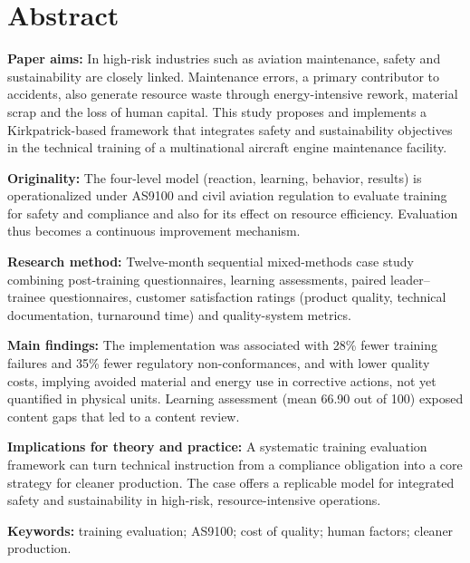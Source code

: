 
\section*{Abstract}

\textbf{Paper aims:} In high-risk industries such as aviation maintenance, safety and sustainability are closely linked. Maintenance errors, a primary contributor to accidents, also generate resource waste through energy-intensive rework, material scrap and the loss of human capital. This study proposes and implements a Kirkpatrick-based framework that integrates safety and sustainability objectives in the technical training of a multinational aircraft engine maintenance facility.

\textbf{Originality:} The four-level model (reaction, learning, behavior, results) is operationalized under AS9100 and civil aviation regulation to evaluate training for safety and compliance and also for its effect on resource efficiency. Evaluation thus becomes a continuous improvement mechanism.

\textbf{Research method:} Twelve-month sequential mixed-methods case study combining post-training questionnaires, learning assessments, paired leader--trainee questionnaires, customer satisfaction ratings (product quality, technical documentation, turnaround time) and quality-system metrics.

\textbf{Main findings:} The implementation was associated with 28\% fewer training failures and 35\% fewer regulatory non-conformances, and with lower quality costs, implying avoided material and energy use in corrective actions, not yet quantified in physical units. Learning assessment (mean 66.90 out of 100) exposed content gaps that led to a content review.

\textbf{Implications for theory and practice:} A systematic training evaluation framework can turn technical instruction from a compliance obligation into a core strategy for cleaner production. The case offers a replicable model for integrated safety and sustainability in high-risk, resource-intensive operations.

\textbf{Keywords:} training evaluation; AS9100; cost of quality; human factors; cleaner production.

